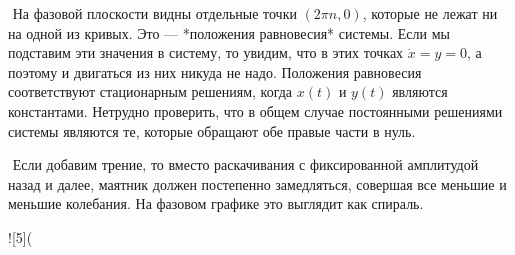 ​	На фазовой плоскости видны отдельные точки $(2\pi n, 0)$, которые не лежат ни на одной из кривых. Это — *положения равновесия* системы. Если мы подставим эти значения в систему, то увидим, что в этих точках $\dot x = y = 0$, а поэтому и двигаться из них никуда не надо. Положения равновесия соответствуют стационарным решениям, когда $x(t)$ и $y(t)$ являются константами. Нетрудно проверить, что в общем случае постоянными решениями системы являются те, которые обращают обе правые части в нуль.

​	Если добавим трение, то вместо раскачивания с фиксированной амплитудой назад и далее, маятник должен постепенно замедляться, совершая все меньшие и меньшие колебания. На фазовом графике это выглядит как спираль.

![5](%
